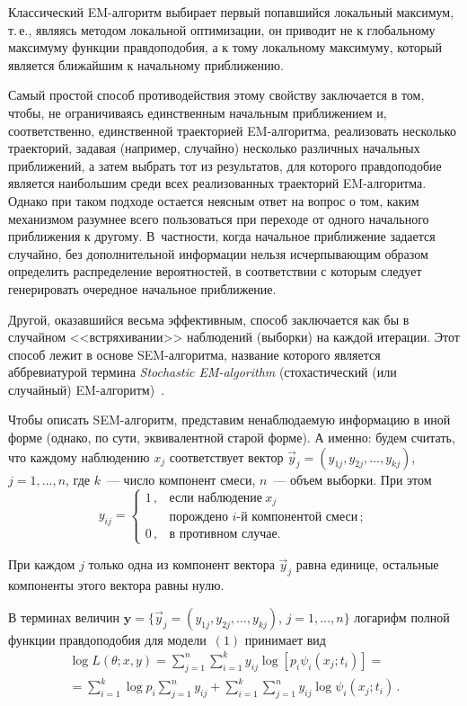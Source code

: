 \begin{multicols}{2}
Классический EM-алгоритм выбирает первый попавшийся локальный
максимум, т.\,е., являясь методом локальной оптимизации, он
приводит не к глобальному максимуму функции правдоподобия, а к тому
локальному максимуму, который является ближайшим к начальному
приближению.

Самый простой способ противодействия этому свойству заключается в
том, чтобы, не ограничиваясь единственным начальным приближением
и, соответственно, единственной траекторией EM-алгоритма,
реализовать несколько траекторий, задавая (например, случайно)
несколько различных начальных приближений, а затем выбрать тот из
результатов, для которого правдоподобие является наибольшим среди
всех реализованных траекторий EM-алгоритма. Однако при таком
подходе остается неясным ответ на вопрос о том, каким механизмом
разумнее всего пользоваться при переходе от одного начального
приближения к другому. В~частности, когда начальное приближение
задается случайно, без дополнительной информации нельзя
исчерпывающим образом определить распределение вероятностей, в
соответствии с которым следует генерировать очередное начальное
приближение.

Другой, оказавшийся весьма эффективным, способ заключается как бы
в случайном <<встряхивании>> наблюдений (выборки) на каждой
итерации. Этот способ лежит в основе SEM-алгоритма, название
которого является аббревиатурой термина {\it Stochastic
EM-algorithm} (стохастический (или
случайный) EM-алгоритм)~\cite{Korolev2007b}.

Чтобы описать SEM-алгоритм, представим ненаблюдаемую информацию в
иной форме (однако, по сути, эквивалентной старой форме). А именно:
будем считать, что каждому наблюдению $x_{j}$ соответствует
вектор $\vec{y}_{j}=(y_{1j},y_{2j}%
,\ldots,y_{kj})$, $j=1,\ldots,n$, где $k$~--- число компонент смеси,
$n$~--- объем
выборки. При этом%
\begin{equation*}
y_{ij}=\begin{cases}
1\,, &\mbox{если
наблюдение}\ x_{j}\\
& \mbox{порождено }i\mbox{-й компонентой
смеси}\,;\\
0\,, &\mbox{в противном случае.}
\end{cases}
\end{equation*}


При каждом $j$ только одна из компонент вектора
$\vec{y}_{j}$ равна единице, остальные компоненты этого вектора равны нулю.

В терминах величин $\mathbf{y}=\{
\vec{y}_{j}=(y_{1j},y_{2j},\ldots,y_{kj})$, $j=1,\ldots,n\}  $
логарифм полной функции правдоподобия для модели~$(1)$
принимает вид%
\begin{multline}
\log L(\theta;x,y)=
\sum\limits_{j=1}^{n}
\sum\limits_{i=1}^{k}
y_{ij}\log\left [ p_{i}\psi_{i}(x_{j};t_{i})\right]={}\\
{}=
\sum\limits_{i=1}^{k}
\log p_{i}
\sum\limits_{j=1}^{n}
y_{ij}+%
\sum\limits_{i=1}^{k}
\sum\limits_{j=1}^{n}
y_{ij}\log\psi_{i}(x_{j};t_{i})\,.
\end{multline}



\end{multicols}
